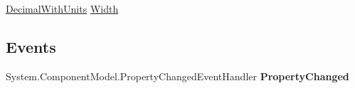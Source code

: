 \begin{DoxyCompactItemize}
\begin{DoxyCompactList}\small\item\em \end{DoxyCompactList}\item 
\hypertarget{class_price___comparison_1_1amazon_1_1ecs_1_1_item_attributes_package_dimensions_a7fbb4cd390739eff2e2ea8077f68b80a}{\hyperlink{class_price___comparison_1_1amazon_1_1ecs_1_1_decimal_with_units}{Decimal\-With\-Units} \hyperlink{class_price___comparison_1_1amazon_1_1ecs_1_1_item_attributes_package_dimensions_a7fbb4cd390739eff2e2ea8077f68b80a}{Width}}\label{class_price___comparison_1_1amazon_1_1ecs_1_1_item_attributes_package_dimensions_a7fbb4cd390739eff2e2ea8077f68b80a}

\begin{DoxyCompactList}\small\item\em \end{DoxyCompactList}\end{DoxyCompactItemize}
\subsection*{Events}
\begin{DoxyCompactItemize}
\item 
\hypertarget{class_price___comparison_1_1amazon_1_1ecs_1_1_item_attributes_package_dimensions_adfe090e310d3571be1581337271ccf8d}{System.\-Component\-Model.\-Property\-Changed\-Event\-Handler {\bfseries Property\-Changed}}\label{class_price___comparison_1_1amazon_1_1ecs_1_1_item_attributes_package_dimensions_adfe090e310d3571be1581337271ccf8d}

\end{DoxyCompactItemize}

